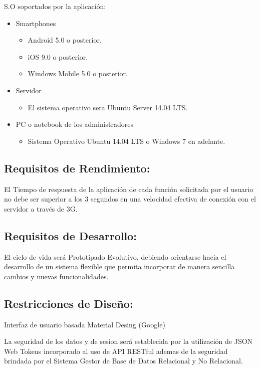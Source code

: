     S.O soportados por la aplicación:
    \begin{itemize}
    \item Smartphones 
    \begin{itemize}
    \item Android 5.0 o posterior.
    \item iOS 9.0 o posterior.
    \item Windows Mobile 5.0 o posterior. 
    \end{itemize}
    \item Servidor 
    \begin{itemize}
    \item  El sistema operativo sera Ubuntu Server 14.04 LTS. 
    \end{itemize}
    \item PC o notebook de los administradores 
    \begin{itemize}
    \item Sistema Operativo Ubuntu 14.04 LTS o Windows 7 en adelante. 
    \end{itemize} 
    \end{itemize}

    \subsection{Requisitos de Rendimiento:}

    El Tiempo de respuesta de la aplicación de cada función solicitada por el usuario no debe ser superior a los 3 segundos en una velocidad efectiva de conexión con el servidor a través de 3G.

    \subsection{Requisitos de Desarrollo:}

    El ciclo de vida será Prototipado Evolutivo, debiendo orientarse hacia el desarrollo de un sistema flexible que permita incorporar de manera sencilla cambios y nuevas funcionalidades.

    \subsection{Restricciones de Diseño:}

     Interfaz de usuario basada Material Desing (Google)

     La seguridad de los datos y de sesion será establecida por la utilización de JSON Web Tokens incorporado al uso de API RESTful ademas de la seguridad brindada por el Sistema Gestor de Base de Datos Relacional y No Relacional.

